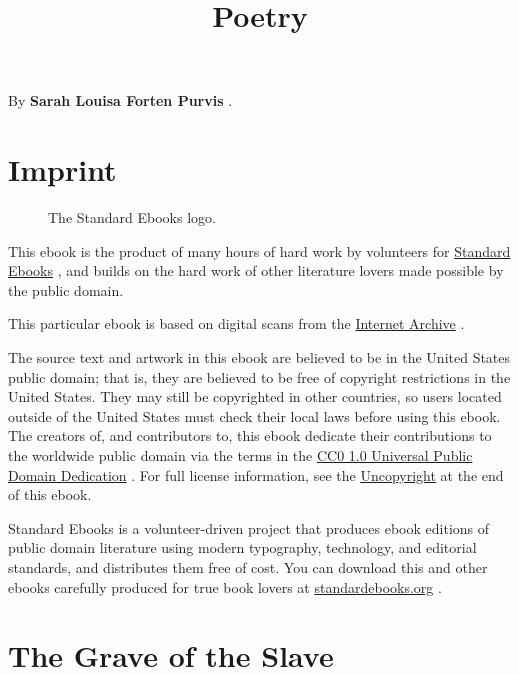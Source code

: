 \documentclass[11pt,a4paper]{article}
\title{Poetry}
\begin{document}
\maketitle

By \textbf{Sarah Louisa Forten Purvis} .

\begin{figure}[h]
\end{figure}

\section{Imprint}

\begin{figure}[h]
\caption{The Standard Ebooks logo.}
\end{figure}

This ebook is the product of many hours of hard work by volunteers for \href{https://standardebooks.org/}{Standard Ebooks} , and builds on the hard work of other literature lovers made possible by the public domain.

This particular ebook is based on digital scans from the \href{https://standardebooks.org/ebooks/sarah-louisa-forten-purvis/poetry\#page-scans}{Internet Archive} .

The source text and artwork in this ebook are believed to be in the United States public domain; that is, they are believed to be free of copyright restrictions in the United States. They may still be copyrighted in other countries, so users located outside of the United States must check their local laws before using this ebook. The creators of, and contributors to, this ebook dedicate their contributions to the worldwide public domain via the terms in the \href{https://creativecommons.org/publicdomain/zero/1.0/}{CC0 1.0 Universal Public Domain Dedication} . For full license information, see the \href{uncopyright.xhtml}{Uncopyright} at the end of this ebook.

Standard Ebooks is a volunteer-driven project that produces ebook editions of public domain literature using modern typography, technology, and editorial standards, and distributes them free of cost. You can download this and other ebooks carefully produced for true book lovers at \href{https://standardebooks.org/}{standardebooks.org} .

\section{The Grave of the Slave}
\end{document}
